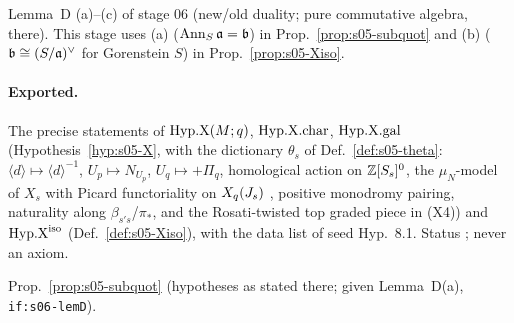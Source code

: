\begin{interface}
Lemma~D (a)--(c) of stage 06 (new/old duality; pure commutative algebra, \stproved{} there). This stage uses (a)
($\operatorname{Ann}_S\mathfrak{a}=\mathfrak{b}$) in Prop.~\ref{prop:s05-subquot} and (b) ($\mathfrak{b}\cong(S/\mathfrak{a})^\vee$ for Gorenstein $S$) in
Prop.~\ref{prop:s05-Xiso}. 
\end{interface}
\noindent{}

\paragraph{Exported.}
\begin{interface}\label{if:s05-hypX}
The precise statements of $\mathrm{Hyp.X}(M;q)$, $\mathrm{Hyp.X.char}$, $\mathrm{Hyp.X.gal}$ (Hypothesis~\ref{hyp:s05-X}, with the dictionary $\theta_s$ of
Def.~\ref{def:s05-theta}: $\langle d\rangle\mapsto\langle d\rangle^{-1}$, $U_p\mapsto N_{U_p}$, $U_q\mapsto+\Pi_q$, homological
action on $\mathbb{Z}[S_s]^0$, the $\mu_N$-model of $X_s$ with Picard functoriality on $X_q(J_s)$
, positive monodromy pairing, naturality along $\beta_{s's}$/$\pi_*$, and
the Rosati-twisted top graded piece in (X4)) and $\mathrm{Hyp.X}^{\mathrm{iso}}$ (Def.~\ref{def:s05-Xiso}), with the data list of seed Hyp.~8.1. Status
\sthyp; never an axiom.
\end{interface}
\begin{interface}\label{if:s05-subquot}
Prop.~\ref{prop:s05-subquot} (hypotheses as stated there; \stproved{} given Lemma~D(a), \texttt{if:s06-lemD}).
\end{interface}

